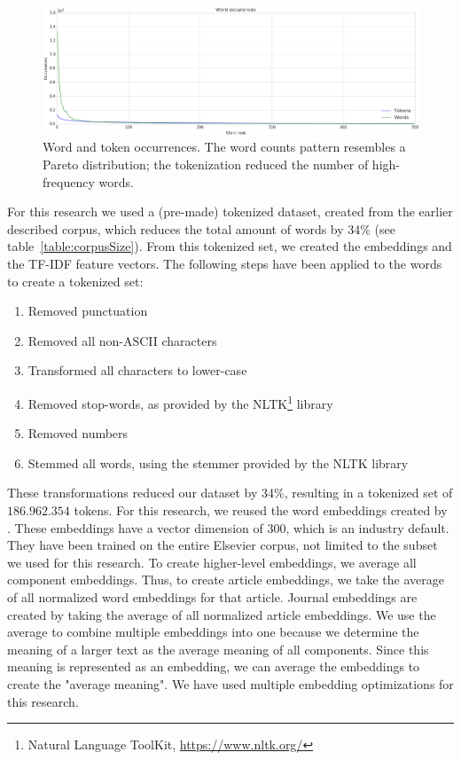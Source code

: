 \documentclass[../../Thesis.tex]{subfiles}
\begin{document}
\FloatBarrier
\begin{figure}[hbt]
\includegraphics[width=6.5in]{Plots/word_occurrences}
\caption{Word and token occurrences. The word counts pattern resembles a Pareto distribution; the tokenization reduced the number of high-frequency words.}\label{figure:wordTokenOccurrence}
\end{figure}
\FloatBarrier
{}
For this research we used a (pre-made) tokenized dataset, created from the earlier described corpus, which reduces the total amount of words by 34\% (see table~\ref{table:corpusSize}). From this tokenized set, we created the embeddings and the TF-IDF feature vectors.
The following steps have been applied to the words to create a tokenized set:
\begin{enumerate}
\item{Removed punctuation}
\item{Removed all non-ASCII characters}
\item{Transformed all characters to lower-case}
\item{Removed stop-words, as provided by the NLTK\footnote{Natural Language ToolKit, \url{https://www.nltk.org/}} library}
\item{Removed numbers}
\item{Stemmed all words, using the stemmer provided by the NLTK library}
\end{enumerate}
These transformations reduced our dataset by 34\%, resulting in a tokenized set of $186.962.354$ tokens.
For this research, we reused the word embeddings created by \citet{Truong2017Thesis}. These embeddings have a vector dimension of 300, which is an industry default. They have been trained on the entire Elsevier corpus, not limited to the subset we used for this research. To create higher-level embeddings, we average all component embeddings. Thus, to create article embeddings, we take the average of all normalized word embeddings for that article. Journal embeddings are created by taking the average of all normalized article embeddings. We use the average to combine multiple embeddings into one because we determine the meaning of a larger text as the average meaning of all components. Since this meaning is represented as an embedding, we can average the embeddings to create the "average meaning". We have used multiple embedding optimizations for this research.
\end{document}
